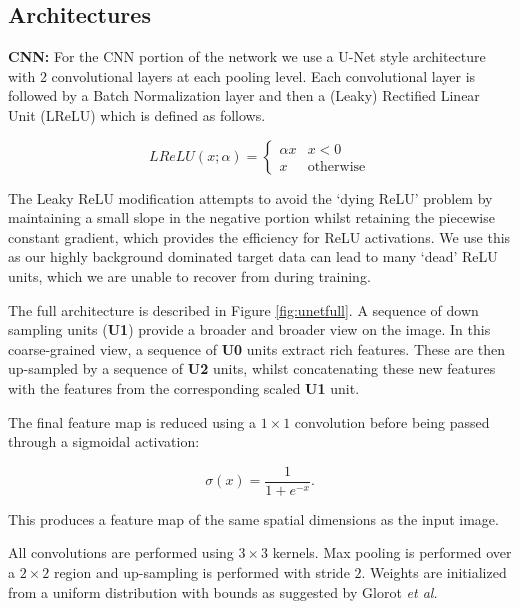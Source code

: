\documentclass[journal,transmag]{IEEEtran}
\begin{document}
\subsection{Architectures}
\label{sec:architectures}

\textbf{CNN: } For the CNN portion of the network we use a U-Net style architecture \cite{Ronneberger2015} with 2 convolutional layers at each pooling level. Each convolutional layer is followed by a Batch Normalization \cite{Ioffe2015} layer and then a (Leaky) Rectified Linear Unit (LReLU) which is defined as follows.

\begin{equation}
LReLU(x; \alpha) = \left\{
\begin{array}{rl}
\alpha x & x < 0 \\
x & \mbox{otherwise}
\end{array} \right.
\end{equation}

The Leaky ReLU modification attempts to avoid the `dying ReLU' problem by maintaining a small slope in the negative portion whilst retaining the piecewise constant gradient, which provides the efficiency for ReLU activations. We use this as our highly background dominated target data can lead to many `dead' ReLU units, which we are unable to recover from during training.

The full architecture is described in Figure \ref{fig:unetfull}. A sequence of down sampling units (\textbf{U1}) provide a broader and broader view on the image. In this coarse-grained view, a sequence of \textbf{U0} units extract rich features. These are then up-sampled by a sequence of \textbf{U2} units, whilst concatenating these new features with the features from the corresponding scaled \textbf{U1} unit. 

The final feature map is reduced using a $1\times1$ convolution before being passed through a sigmoidal activation:

\begin{equation}
\sigma(x) = \frac{1}{1 + e^{-x}}.
\end{equation}

This produces a feature map of the same spatial dimensions as the input image. 

All convolutions are performed using $3 \times 3$ kernels. Max pooling is performed over a $2 \times 2$ region and up-sampling is performed with stride $2$. Weights are initialized from a uniform distribution with bounds as suggested by Glorot \textit{et al.} \cite{Glorot}
\end{document}

